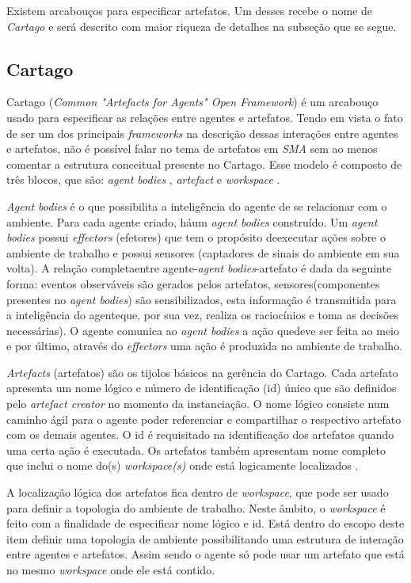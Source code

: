 Existem arcabouços para especificar artefatos. Um desses recebe o nome de \textit{Cartago} e será descrito com maior riqueza de detalhes na subseção que se segue.
 
\subsection{Cartago}

Cartago (\textit{Common "Artefacts for Agents" Open Framework}) é um arcabouço usado para especificar as relações entre agentes e artefatos. Tendo em vista o fato de ser um dos principais \textit{frameworks} na descrição dessas interações entre agentes e artefatos, não é possível falar no tema de artefatos em \textit{SMA} sem ao menos comentar a estrutura conceitual presente no Cartago. Esse modelo é composto de três blocos, que são: \textit{agent bodies} , \textit{artefact} e \textit{workspace} \cite{cartago}.

\textit{Agent bodies} é  o que possibilita a inteligência do agente de se relacionar com o ambiente. Para cada agente criado, háum \textit{agent bodies} construído. Um \textit{agent bodies} possui \textit{effectors} (efetores) que tem o propósito deexecutar ações sobre o ambiente de trabalho e possui sensores (captadores de sinais do ambiente em sua volta). A relação completaentre agente-\textit{agent bodies}-artefato é dada da seguinte forma: eventos observáveis são gerados pelos artefatos, sensores(componentes presentes no \textit{agent bodies}) são sensibilizados, esta informação é transmitida para a inteligência do  agenteque, por sua vez, realiza os raciocínios e toma as decisões necessárias). O agente comunica ao \textit{agent bodies} a ação quedeve ser feita ao meio e por último, através do \textit{effectors} uma ação é produzida no ambiente de trabalho. 

\textit{Artefacts} (artefatos) são os tijolos básicos na gerência do Cartago. Cada artefato apresenta um nome lógico e número de identificação (id) único que são definidos pelo \textit{artefact creator} no momento da instanciação. O nome lógico consiste num caminho ágil para o agente poder referenciar  e compartilhar o respectivo artefato com os demais agentes. O id é requisitado na identificação dos artefatos quando uma certa ação é executada. Os artefatos também apresentam nome completo que inclui o nome do(s) \textit{workspace(s)} onde está logicamente localizados \cite{cartago}.

A localização lógica dos artefatos fica dentro de \textit{workspace}, que pode ser usado para definir a topologia do ambiente de trabalho. Neste âmbito, o \textit{workspace} é feito com a finalidade de especificar nome lógico e id. Está dentro do escopo deste item definir uma topologia de ambiente possibilitando uma estrutura de interação entre agentes e artefatos. Assim sendo o agente só pode usar um artefato que está no mesmo \textit{workspace} onde ele está contido. 
